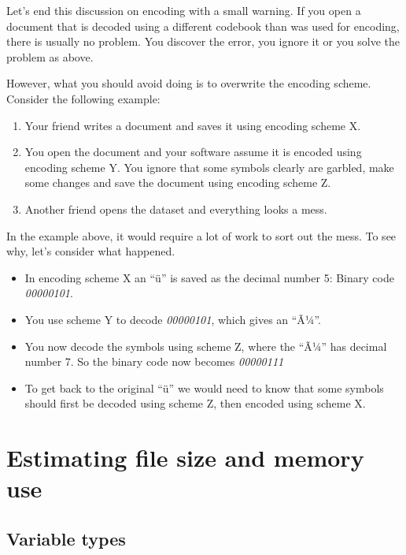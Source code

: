 \documentclass[]{book}
\providecommand{\tightlist}{%
  \setlength{\itemsep}{0pt}\setlength{\parskip}{0pt}}
\begin{document}
Let's end this discussion on encoding with a small warning. If you open a document that is decoded using a different codebook than was used for encoding, there is usually no problem. You discover the error, you ignore it or you solve the problem as above.

However, what you should avoid doing is to overwrite the encoding scheme. Consider the following example:

\begin{enumerate}
\def\labelenumi{\arabic{enumi}.}
\tightlist
\item
  Your friend writes a document and saves it using encoding scheme X.
\item
  You open the document and your software assume it is encoded using encoding scheme Y. You ignore that some symbols clearly are garbled, make some changes and save the document using encoding scheme Z.
\item
  Another friend opens the dataset and everything looks a mess.
\end{enumerate}

In the example above, it would require a lot of work to sort out the mess. To see why, let's consider what happened.

\begin{itemize}
\tightlist
\item
  In encoding scheme X an ``ü'' is saved as the decimal number 5: Binary code \emph{00000101}.
\item
  You use scheme Y to decode \emph{00000101}, which gives an ``Ã¼''.
\item
  You now decode the symbols using scheme Z, where the ``Ã¼'' has decimal number 7. So the binary code now becomes \emph{00000111}
\item
  To get back to the original ``ü'' we would need to know that some symbols should first be decoded using scheme Z, then encoded using scheme X.
\end{itemize}

\hypertarget{estimating-file-size-and-memory-use}{%
\section{Estimating file size and memory use}\label{estimating-file-size-and-memory-use}}

\hypertarget{variable-types}{%
\subsection{Variable types}\label{variable-types}}
\end{document}
